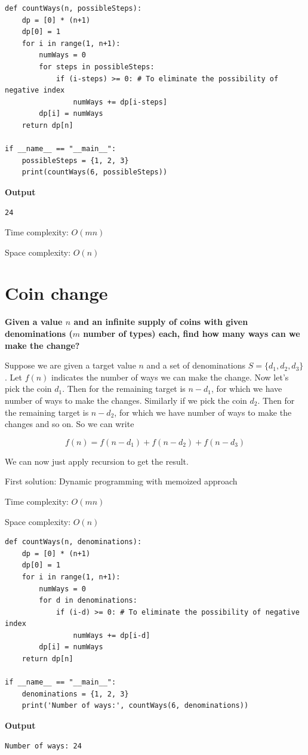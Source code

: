 \documentclass[a4paper,11pt]{book}
\begin{document}
\begin{lstlisting}
def countWays(n, possibleSteps):
    dp = [0] * (n+1)
    dp[0] = 1
    for i in range(1, n+1):
        numWays = 0
        for steps in possibleSteps:
            if (i-steps) >= 0: # To eliminate the possibility of negative index
                numWays += dp[i-steps]
        dp[i] = numWays
    return dp[n]

if __name__ == "__main__":
    possibleSteps = {1, 2, 3}
    print(countWays(6, possibleSteps))
\end{lstlisting}
\textbf{Output}
\begin{lstlisting}
24
\end{lstlisting}

\noindent Time complexity: $O(mn)$

\noindent Space complexity: $O(n)$

\newpage
\section{Coin change}

\noindent \textbf{Given a value $n$ and an infinite supply of coins with given denominations ($m$ number of types) each, find how many ways can we make the change?}

\vspace{5mm}

\noindent Suppose we are given a target value $n$ and a set of denominations $S = \{d_1, d_2, d_3\}$. Let $f(n)$ indicates the number of ways we can make the change. Now let's pick the coin  $d_1$. Then for the remaining target is $n-d_1$, for which we have number of ways to make the changes. Similarly if we pick the coin  $d_2$. Then for the remaining target is $n-d_2$, for which we have number of ways to make the changes and so on. So we can write

$$f(n) = f(n-d_1) + f(n-d_2) + f(n-d_3)$$

\noindent We can now just apply recursion to get the result.

\noindent First solution: Dynamic programming with memoized approach
\vspace{5mm}

\noindent Time complexity: $O(mn)$

\noindent Space complexity: $O(n)$

\begin{lstlisting}
def countWays(n, denominations):
    dp = [0] * (n+1)
    dp[0] = 1
    for i in range(1, n+1):
        numWays = 0
        for d in denominations:
            if (i-d) >= 0: # To eliminate the possibility of negative index
                numWays += dp[i-d]
        dp[i] = numWays
    return dp[n]

if __name__ == "__main__":
    denominations = {1, 2, 3}
    print('Number of ways:', countWays(6, denominations))
\end{lstlisting}
\textbf{Output}
\begin{lstlisting}
Number of ways: 24
\end{lstlisting}
\end{document}

